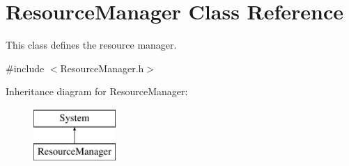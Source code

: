 \hypertarget{class_resource_manager}{}\section{Resource\+Manager Class Reference}
\label{class_resource_manager}


This class defines the resource manager.  




{\ttfamily \#include $<$Resource\+Manager.\+h$>$}

Inheritance diagram for Resource\+Manager\+:\begin{figure}[H]
\begin{center}
\leavevmode
\includegraphics[height=2.000000cm]{class_resource_manager}
\end{center}
\end{figure}
